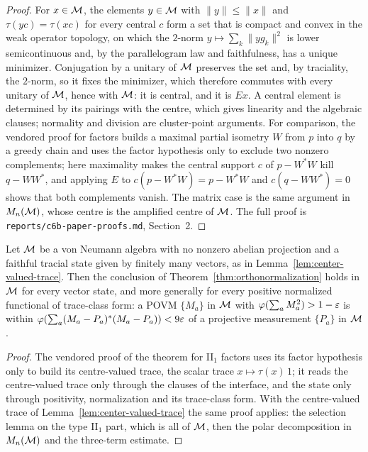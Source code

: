 \begin{proof}
\leanok
For $x \in \cal{M}$, the elements $y \in \cal{M}$ with $\|y\| \le \|x\|$ and $\tau(yc) = \tau(xc)$
for every central $c$ form a set that is compact and convex in the weak operator topology, on
which the $2$-norm $y \mapsto \sum_k \|y g_k\|^2$ is lower semicontinuous and, by the
parallelogram law and faithfulness, has a unique minimizer. Conjugation by a unitary of
$\cal{M}$ preserves the set and, by traciality, the $2$-norm, so it fixes the minimizer, which
therefore commutes with every unitary of $\cal{M}$, hence with $\cal{M}$: it is central, and it is
$E x$. A central element is determined by its pairings with the centre, which gives linearity
and the algebraic clauses; normality and division are cluster-point arguments. For comparison,
the vendored proof for factors builds a maximal partial isometry $W$ from $p$ into $q$ by a greedy
chain and uses the factor hypothesis only to exclude two nonzero complements; here maximality
makes the central support $c$ of $p - W^*W$ kill $q - WW^*$, and applying $E$ to
$c(p - W^*W) = p - W^*W$ and $c(q - WW^*) = 0$ shows that both complements vanish. The matrix
case is the same argument in $M_n(\cal{M})$, whose centre is the amplified centre of $\cal{M}$.
The full proof is \texttt{reports/c6b-paper-proofs.md}, Section~2.
\end{proof}

\begin{theorem}
\label{thm:orthonormalization-no-abelian}
\leanok
Let $\cal{M}$ be a von Neumann algebra with no nonzero abelian projection and a faithful tracial
state given by finitely many vectors, as in Lemma~\ref{lem:center-valued-trace}. Then the
conclusion of Theorem~\ref{thm:orthonormalization} holds in $\cal{M}$ for every vector state,
and more generally for every positive normalized functional of trace-class form: a POVM
$\{M_a\}$ in $\cal{M}$ with $\varphi(\sum_a M_a^2) > 1 - \eps$ is within
$\varphi(\sum_a (M_a - P_a)^*(M_a - P_a)) < 9\eps$ of a projective measurement $\{P_a\}$ in
$\cal{M}$.
\end{theorem}

\begin{proof}
\leanok
The vendored proof of the theorem for II$_1$ factors uses its factor hypothesis only to build its
centre-valued trace, the scalar trace $x \mapsto \tau(x)\,1$; it reads the centre-valued trace only
through the clauses of the interface, and the state only through positivity, normalization and
its trace-class form. With the centre-valued trace of Lemma~\ref{lem:center-valued-trace} the same
proof applies: the selection lemma on the type II$_1$ part, which is all of $\cal{M}$, then the
polar decomposition in $M_n(\cal{M})$ and the three-term estimate.
\end{proof}

